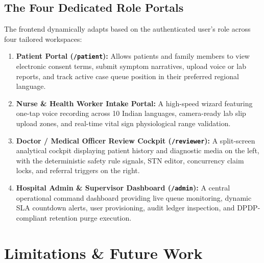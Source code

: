 \documentclass[11pt,a4paper,oneside]{report}
\begin{document}
\section{The Four Dedicated Role Portals}
The frontend dynamically adapts based on the authenticated user's role across four tailored workspaces:
\begin{enumerate}[leftmargin=20pt]
  \item \textbf{Patient Portal (\texttt{/patient}):} Allows patients and family members to view electronic consent terms, submit symptom narratives, upload voice or lab reports, and track active case queue position in their preferred regional language.
  \item \textbf{Nurse \& Health Worker Intake Portal:} A high-speed wizard featuring one-tap voice recording across 10 Indian languages, camera-ready lab slip upload zones, and real-time vital sign physiological range validation.
  \item \textbf{Doctor / Medical Officer Review Cockpit (\texttt{/reviewer}):} A split-screen analytical cockpit displaying patient history and diagnostic media on the left, with the deterministic safety rule signals, STN editor, concurrency claim locks, and referral triggers on the right.
  \item \textbf{Hospital Admin \& Supervisor Dashboard (\texttt{/admin}):} A central operational command dashboard providing live queue monitoring, dynamic SLA countdown alerts, user provisioning, audit ledger inspection, and DPDP-compliant retention purge execution.
\end{enumerate}

\chapter{Limitations \& Future Work}
\end{document}
